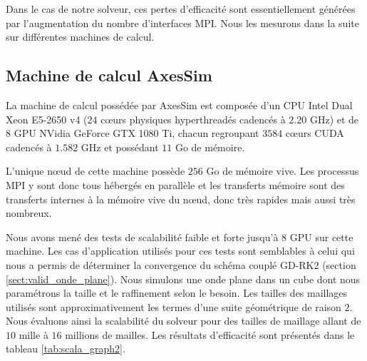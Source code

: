 Dans le cas de notre solveur, ces pertes d'efficacité sont
essentiellement générées
par l'augmentation du nombre d'interfaces MPI.
Nous les mesurons dans la suite sur différentes machines de calcul.
\\


\subsection{Machine de calcul AxesSim}
\label{ssect:graph2}

La machine de calcul possédée par AxesSim est composée d'un
CPU Intel Dual Xeon E5-2650 v4
($24$ cœurs physiques hyperthreadés cadencés à $2.20$ GHz)
et de $8$ GPU NVidia GeForce GTX 1080 Ti, chacun regroupant
$3584$ cœurs CUDA cadencés à $1.582$ GHz et possédant $11$ Go de mémoire.

L'unique nœud de cette machine possède $256$ Go de mémoire vive.
Les processus MPI y sont donc tous hébergés en parallèle
et les transferts mémoire sont des transferts internes
à la mémoire vive du nœud, donc très rapides mais aussi très nombreux.

Nous avons mené des tests de scalabilité faible et forte
jusqu'à $8$ GPU sur cette machine.
Les cas d'application utilisés pour ces tests sont semblables à celui
qui nous a permis de déterminer la convergence du schéma couplé
GD-RK$2$ (section \ref{sect:valid_onde_plane}).
Nous simulons une onde plane dans un cube dont nous paramétrons la
taille et le raffinement selon le besoin. Les tailles des maillages utilisés
sont approximativement les termes d'une suite géométrique de raison $2$.
Nous évaluons ainsi la scalabilité du solveur
pour des tailles de maillage allant de $10$ mille à $16$ millions de mailles.
Les résultats d'efficacité sont présentés dans le tableau \ref{tab:scala_graph2}.


